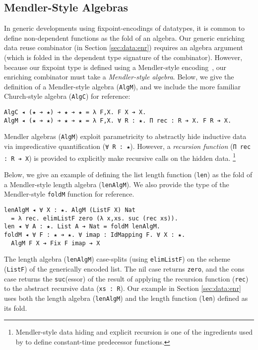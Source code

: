 \documentclass[acmsmall,screen]{acmart}
\newcommand{\refsec}[1]{Section \ref{sec:#1}}
\newcommand{\labsec}[1]{\label{sec:#1}}
\begin{document}
\subsection{Mendler-Style Algebras}
\labsec{data:mendler}

In generic developments using fixpoint-encodings of datatypes, it is
common to define non-dependent functions as the fold of an algebra.
Our generic enriching data reuse combinator (in \refsec{data:enr})
requires an algebra argument (which is folded in the dependent type signature of
the combinator). However, because our fixpoint type is defined
using a Mendler-style encoding~\cite{firsov18b}, our enriching combinator
must take a \textit{Mendler-style algebra}. Below, we give the definition of
a Mendler-style algebra (\verb;AlgM;), and we include the more familiar
Church-style algebra (\verb;AlgC;) for reference:
\begin{verbatim}
AlgC ◂ (★ ➔ ★) ➔ ★ ➔ ★ = λ F,X. F X ➔ X.
AlgM ◂ (★ ➔ ★) ➔ ★ ➔ ★ = λ F,X. ∀ R : ★. Π rec : R ➔ X. F R ➔ X.
\end{verbatim}
Mendler algebras (\verb;AlgM;) exploit parametricity to abstractly
hide inductive data via impredicative quantification
(\verb;∀ R : ★;). However, a \textit{recursion function}
(\verb;Π rec : R ➔ X;) is provided to explicitly make recursive calls
on the hidden data. \footnote{
  Mendler-style data hiding and explicit recursion is one of the
  ingredients used by \cite{firsov18b} to define constant-time
  predecessor functions.
}

Below, we give an example of defining the list length function
(\verb;len;) as the fold of a Mendler-style length algebra
(\verb;lenAlgM;). We also provide the type of the Mendler-style
\verb;foldM; function for reference.
\begin{verbatim}
lenAlgM ◂ ∀ X : ★. AlgM (ListF X) Nat
  = λ rec. elimListF zero (λ x,xs. suc (rec xs)).
len ◂ ∀ A : ★. List A ➔ Nat = foldM lenAlgM.
foldM ◂ ∀ F : ★ ➔ ★. ∀ imap : IdMapping F. ∀ X : ★. 
  AlgM F X ➔ Fix F imap ➔ X
\end{verbatim}
The length algebra (\verb;lenAlgM;) case-splits (using
\verb;elimListF;) on the scheme (\verb;ListF;) of the generically
encoded list. The nil case returns \verb;zero;, and the cons case
returns the \verb;suc;(essor) of the result of applying the recursion
function (\verb;rec;) to the abstract recursive data (\verb;xs : R;).
Our example in \refsec{data:enr} uses both the
length algebra (\verb;lenAlgM;) and the
length function (\verb;len;) defined as its fold.
\end{document}
